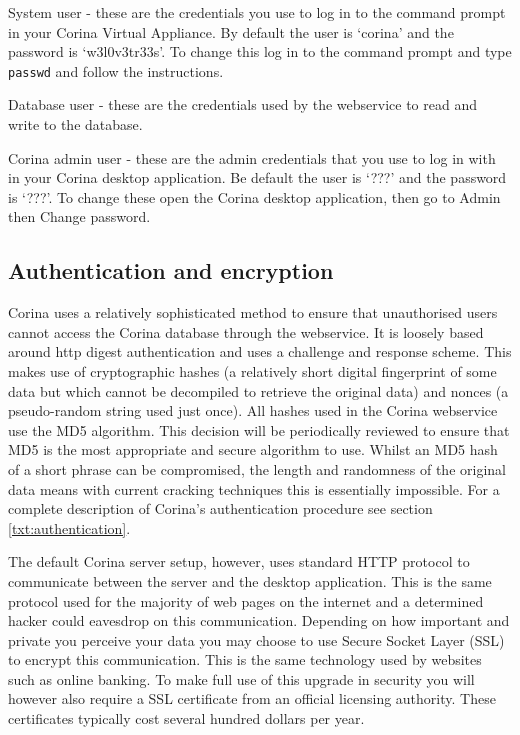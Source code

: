 \begin{description*}
 \item[System user] - these are the credentials you use to log in to the command prompt in your Corina Virtual Appliance.  By default the user is `corina' and the password is `w3l0v3tr33s'.  To change this log in to the command prompt and type \verb|passwd| and follow the instructions.
 \item[Database user] - these are the credentials used by the webservice to read and write to the database.  
 \item[Corina admin user] - these are the admin credentials that you use to log in with in your Corina desktop application.  Be default the user is `???' and the password is `???'.  To change these open the Corina desktop application, then go to Admin then Change password.
\end{description*}

\subsection{Authentication and encryption}
Corina uses a relatively sophisticated method to ensure that unauthorised users cannot access the Corina database through the webservice.  It is loosely based around http digest authentication and uses a challenge and response scheme.  This makes use of cryptographic hashes (a relatively short digital fingerprint of some data but which cannot be decompiled to retrieve the original data) and nonces (a pseudo-random string used just once). All hashes used in the Corina webservice use the MD5 algorithm. This decision will be periodically reviewed to ensure that MD5 is the most appropriate and secure algorithm to use. Whilst an MD5 hash of a short phrase can be compromised, the length and randomness of the original data means with current cracking techniques this is essentially impossible.   For a complete description of Corina's authentication procedure see section \ref{txt:authentication}.

The default Corina server setup, however, uses standard HTTP protocol to communicate between the server and the desktop application.  This is the same protocol used for the majority of web pages on the internet and a determined hacker could eavesdrop on this communication.  Depending on how important and private you perceive your data you may choose to use Secure Socket Layer (SSL) to encrypt this communication.  This is the same technology used by websites such as online banking.  To make full use of this upgrade in security you will however also require a SSL certificate from an official licensing authority.  These certificates typically cost several hundred dollars per year. 


